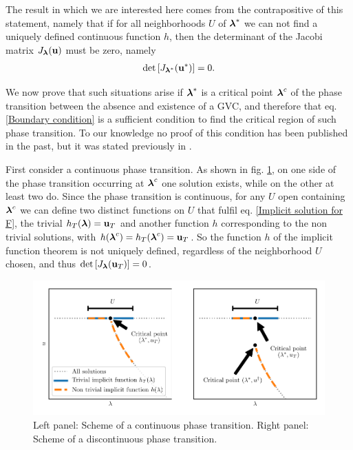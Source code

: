 \documentclass[
11pt, %
american, %
singlespacing, %
final, %
nolistspacing, %
liststotoc, %
headsepline, %
]{MastersDoctoralThesis} %
\begin{document}
The result in which we are interested here comes from the contrapositive of this statement, namely that if for all neighborhoods $U$ of $\boldsymbol{\mathrm{\lambda}}^*$ we can not find a uniquely defined continuous function $h$, then the determinant of the Jacobi matrix $J_{\boldsymbol{\mathrm{\lambda}}}(\boldsymbol{\mathrm{u}})$ must be zero, namely
\begin{align}
	\det\left[ J_{\boldsymbol{\mathrm{\lambda}}^*}(\boldsymbol{\mathrm{u}}^*) \right] = 0 \label{Boundary condition}.
\end{align}

We now prove that such situations arise if $\boldsymbol{\mathrm{\lambda}}^*$ is a critical point $\boldsymbol{\mathrm{\lambda}}^c$ of the phase transition between the absence and existence of a GVC, and therefore that eq. \eqref{Boundary condition} is a sufficient condition to find the critical region of such phase transition. To our knowledge no proof of this condition has been published in the past, but it was stated previously in \cite{baxter2012avalanche}.

First consider a continuous phase transition. As shown in fig. \ref{Figure: Scheme of continuous and discontinuous phase transitions}, on one side of the phase transition occurring at $\boldsymbol{\mathrm{\lambda}}^c$ one solution exists, while on the other at least two do. Since the phase transition is continuous, for any $U$ open containing $\boldsymbol{\mathrm{\lambda}}^c$ we can define two distinct functions on $U$ that fulfil eq. \eqref{Implicit solution for F}, the trivial $h_T(\boldsymbol{\mathrm{\lambda}}) = \boldsymbol{\mathrm{u}}_T$ and another function $h$ corresponding to the non trivial solutions, with $h(\boldsymbol{\mathrm{\lambda}}^c) = h_T(\boldsymbol{\mathrm{\lambda}}^c) = \boldsymbol{\mathrm{u}}_T$. So the function $h$ of the implicit function theorem is not uniquely defined, regardless of the neighborhood $U$ chosen, and thus $\det\left[ J_{\boldsymbol{\mathrm{\lambda}}}(\boldsymbol{\mathrm{u}}_T) \right] = 0$.

\begin{figure}
	\includegraphics[width=\textwidth]{critical_point.pdf}
	\caption{Left panel: Scheme of a continuous phase transition. Right panel: Scheme of a discontinuous phase transition.}
	\label{Figure: Scheme of continuous and discontinuous phase transitions}
\end{figure}
\end{document}
